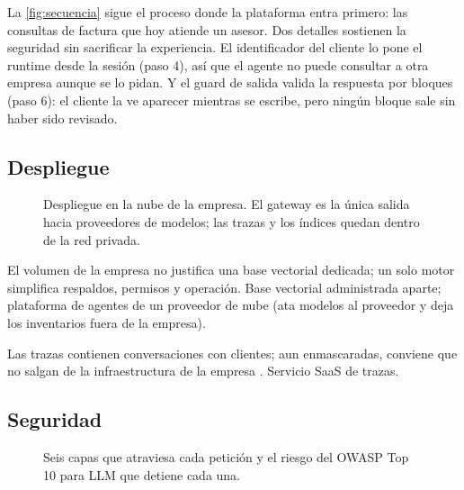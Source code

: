 La \cref{fig:secuencia} sigue el proceso donde la plataforma entra primero: las consultas
de factura que hoy atiende un asesor. Dos detalles sostienen la seguridad sin sacrificar la
experiencia. El identificador del cliente lo pone el runtime desde la sesión (paso 4), así
que el agente no puede consultar a otra empresa aunque se lo pidan. Y el guard de salida
valida la respuesta por bloques (paso 6): el cliente la ve aparecer mientras se escribe, pero
ningún bloque sale sin haber sido revisado.

\subsection{Despliegue}
\begin{figure}[!htbp]
  \centering
  
  \caption{Despliegue en la nube de la empresa. El gateway es la única salida hacia proveedores de
  modelos; las trazas y los índices quedan dentro de la red privada.}
  \label{fig:despliegue}
\end{figure}

{El volumen de la empresa no justifica una base vectorial dedicada; un solo motor simplifica
respaldos, permisos y operación.}
{Base vectorial administrada aparte; plataforma de agentes de un proveedor de nube (ata
modelos al proveedor y deja los inventarios fuera de la empresa).}

{Las trazas contienen conversaciones con clientes; aun enmascaradas, conviene que no salgan
de la infraestructura de la empresa \citep{ley1581}.}
{Servicio SaaS de trazas.}

\subsection{Seguridad}
\begin{figure}[!htbp]
  \centering
  
  \caption{Seis capas que atraviesa cada petición y el riesgo del OWASP Top 10 para LLM
  \citep{owasp2025llm} que detiene cada una.}
  \label{fig:seguridad}
\end{figure}

